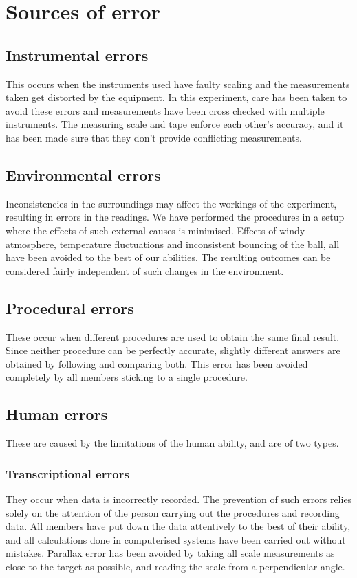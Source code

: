 \documentclass{article}
\begin{document}
\begin{sloppypar}
\section{Sources of error}
\subsection{Instrumental errors}
 This occurs when the instruments used have faulty scaling and the measurements taken get distorted by the equipment. In this experiment, care has been taken to avoid these errors and measurements have been cross checked with multiple instruments. The measuring scale and tape enforce each other's accuracy, and it has been made sure that they don't provide conflicting measurements.
\subsection{Environmental errors}
Inconsistencies in the surroundings may affect the workings of the experiment, resulting in errors in the readings. We have performed the procedures in a setup where the effects of such external causes is minimised. Effects of windy atmosphere, temperature fluctuations and inconsistent bouncing of the ball, all have been avoided to the best of our abilities. The resulting outcomes can be considered fairly independent of such changes in the environment.
\subsection{Procedural errors}
These occur when different procedures are used to obtain the same final result. Since neither procedure can be perfectly accurate, slightly different answers are obtained by following and comparing both. This error has been avoided completely by all members sticking to a single procedure.
\subsection{Human errors}
These are caused by the limitations of the human ability, and are of two types.
\subsubsection{Transcriptional errors}
They occur when data is incorrectly recorded. The prevention of such errors relies solely on the attention of the person carrying out the procedures and recording data. All members have put down the data attentively to the best of their ability, and all calculations done in computerised systems have been carried out without mistakes. Parallax error has been avoided by taking all scale measurements as close to the target as possible, and reading the scale from a perpendicular angle.

\end{sloppypar}
\end{document}
